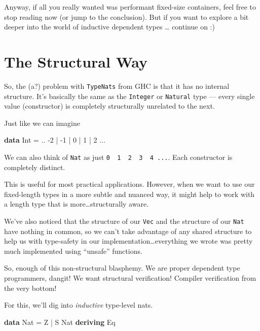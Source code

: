 \documentclass[]{article}
\newenvironment{Shaded}{}{}
\newcommand{\DataTypeTok}[1]{\textcolor[rgb]{0.56,0.13,0.00}{#1}}
\newcommand{\DecValTok}[1]{\textcolor[rgb]{0.25,0.63,0.44}{#1}}
\newcommand{\KeywordTok}[1]{\textcolor[rgb]{0.00,0.44,0.13}{\textbf{#1}}}
\newcommand{\OperatorTok}[1]{\textcolor[rgb]{0.40,0.40,0.40}{#1}}
\newcommand{\OtherTok}[1]{\textcolor[rgb]{0.00,0.44,0.13}{#1}}
\begin{document}
Anyway, if all you really wanted was performant fixed-size containers, feel free
to stop reading now (or jump to the conclusion). But if you want to explore a
bit deeper into the world of inductive dependent types \ldots{} continue on :)

\hypertarget{the-structural-way}{%
\section{The Structural Way}\label{the-structural-way}}

So, the (a?) problem with \texttt{TypeNats} from GHC is that it has no internal
structure. It's basically the same as the \texttt{Integer} or \texttt{Natural}
type --- every single value (constructor) is completely structurally unrelated
to the next.

Just like we can imagine

\begin{Shaded}
\begin{Highlighting}[]
\KeywordTok{data} \DataTypeTok{Int} \OtherTok{=} \OperatorTok{..} \OperatorTok{{-}}\DecValTok{2} \OperatorTok{|} \OperatorTok{{-}}\DecValTok{1} \OperatorTok{|} \DecValTok{0} \OperatorTok{|} \DecValTok{1} \OperatorTok{|} \DecValTok{2} \OperatorTok{...}
\end{Highlighting}
\end{Shaded}

We can also think of \texttt{Nat} as just
\texttt{0\ \textbar{}\ 1\ \textbar{}\ 2\ \textbar{}\ 3\ \textbar{}\ 4\ ...}.
Each constructor is completely distinct.

This is useful for most practical applications. However, when we want to use our
fixed-length types in a more subtle and nuanced way, it might help to work with
a length type that is more\ldots structurally aware.

We've also noticed that the structure of our \texttt{Vec} and the structure of
our \texttt{Nat} have nothing in common, so we can't take advantage of any
shared structure to help us with type-safety in our
implementation\ldots everything we wrote was pretty much implemented using
``unsafe'' functions.

So, enough of this non-structural blasphemy. We are proper dependent type
programmers, dangit! We want structural verification! Compiler verification from
the very bottom!

For this, we'll dig into \emph{inductive} type-level nats.

\begin{Shaded}
\begin{Highlighting}[]
\KeywordTok{data} \DataTypeTok{Nat} \OtherTok{=} \DataTypeTok{Z} \OperatorTok{|} \DataTypeTok{S} \DataTypeTok{Nat}
  \KeywordTok{deriving} \DataTypeTok{Eq}
\end{Highlighting}
\end{Shaded}
\end{document}
